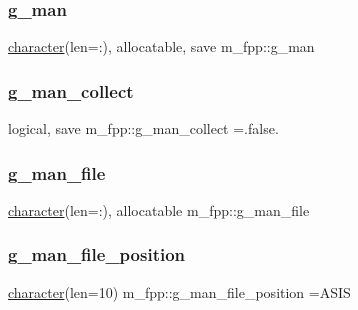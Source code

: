 \mbox{\label{namespacem__fpp_a5f6c0f34d4f3cce3be8c2b57f0da6aaa}} 
\subsubsection{\texorpdfstring{g\+\_\+man}{g\_man}}
{\footnotesize\ttfamily \hyperlink{option__stopwatch_83_8txt_abd4b21fbbd175834027b5224bfe97e66}{character}(len=\+:), allocatable, save m\+\_\+fpp\+::g\+\_\+man}

\mbox{\label{namespacem__fpp_a31995f20860d3826319a0efa28af429e}} 
\subsubsection{\texorpdfstring{g\+\_\+man\+\_\+collect}{g\_man\_collect}}
{\footnotesize\ttfamily logical, save m\+\_\+fpp\+::g\+\_\+man\+\_\+collect =.false.}

\mbox{\label{namespacem__fpp_a398b992e80b784e7cccefd3e87d91761}} 
\subsubsection{\texorpdfstring{g\+\_\+man\+\_\+file}{g\_man\_file}}
{\footnotesize\ttfamily \hyperlink{option__stopwatch_83_8txt_abd4b21fbbd175834027b5224bfe97e66}{character}(len=\+:), allocatable m\+\_\+fpp\+::g\+\_\+man\+\_\+file}

\mbox{\label{namespacem__fpp_afce7ea0f200a4b77fbfcd9f88fa0bfd0}} 
\subsubsection{\texorpdfstring{g\+\_\+man\+\_\+file\+\_\+position}{g\_man\_file\_position}}
{\footnotesize\ttfamily \hyperlink{option__stopwatch_83_8txt_abd4b21fbbd175834027b5224bfe97e66}{character}(len=10) m\+\_\+fpp\+::g\+\_\+man\+\_\+file\+\_\+position =\textquotesingle{}A\+S\+IS \textquotesingle{}}

